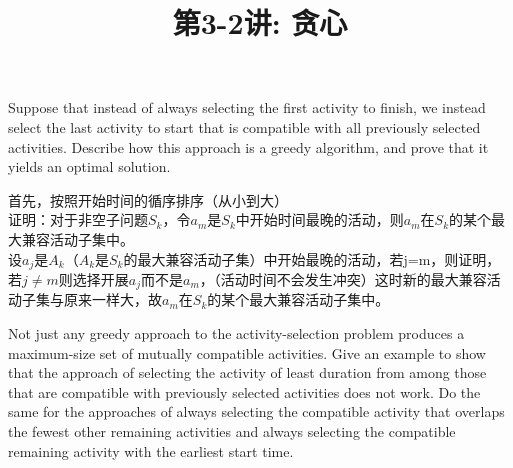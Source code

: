 \documentclass[a4paper, justified]{tufte-handout}
\title{第3-2讲: 贪心}
\date{\zhtoday} %
\begin{document}
\maketitle
\noplagiarism %
\begin{abstract}
\end{abstract}
\beginrequired

\begin{problem}[TC 16.1-2]
Suppose that instead of always selecting the first activity to finish, we instead select
the last activity to start that is compatible with all previously selected activities. Describe how this approach is a greedy algorithm, and prove that it yields an optimal
solution.
\end{problem}

\begin{solution}
首先，按照开始时间的循序排序（从小到大）\\
证明：对于非空子问题$S_k$，令$a_m$是$S_k$中开始时间最晚的活动，则$a_m$在$S_k$的某个最大兼容活动子集中。\\
设$a_j$是$A_k$（$A_k$是$S_k$的最大兼容活动子集）中开始最晚的活动，若j=m，则证明，若$j\neq m$则选择开展$a_j$而不是$a_m$，（活动时间不会发生冲突）这时新的最大兼容活动子集与原来一样大，故$a_m$在$S_k$的某个最大兼容活动子集中。
\end{solution}

\begin{problem}[TC 16.1-3]
Not just any greedy approach to the activity-selection problem produces a maximum-size set of mutually compatible activities. Give an example to show that
the approach of selecting the activity of least duration from among those that are
compatible with previously selected activities does not work. Do the same for
the approaches of always selecting the compatible activity that overlaps the fewest
other remaining activities and always selecting the compatible remaining activity
with the earliest start time.

\end{problem}
\end{document}
